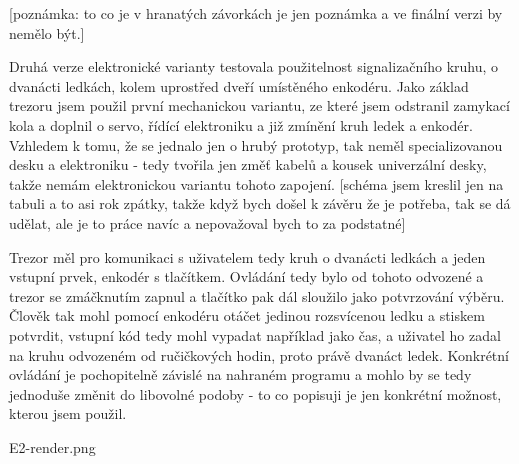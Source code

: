[poznámka: to co je v hranatých závorkách je jen poznámka a ve finální verzi by nemělo být.]

Druhá verze elektronické varianty testovala použitelnost signalizačního kruhu, o dvanácti ledkách, kolem uprostřed dveří
umístěného enkodéru. Jako základ trezoru jsem použil první mechanickou variantu, ze které jsem odstranil zamykací kola 
a doplnil o servo, řídící elektroniku a již zmínění kruh ledek a enkodér.
Vzhledem k tomu, že se jednalo jen o hrubý prototyp, tak neměl specializovanou desku a elektroniku - tedy tvořila jen změť kabelů 
a kousek univerzální desky, takže nemám elektronickou variantu tohoto zapojení. [schéma jsem kreslil jen na tabuli a to asi rok 
zpátky, takže když bych došel k závěru že je potřeba, tak se dá udělat, ale je to práce navíc a nepovažoval bych to za podstatné]

Trezor měl pro komunikaci s uživatelem tedy kruh o dvanácti ledkách a jeden vstupní prvek, enkodér s tlačítkem.
Ovládání tedy bylo od tohoto odvozené a trezor se zmáčknutím zapnul a tlačítko pak dál sloužilo jako potvrzování výběru.
Člověk tak mohl pomocí enkodéru otáčet jedinou rozsvícenou ledku a stiskem potvrdit, vstupní kód tedy mohl vypadat 
například jako čas, a uživatel ho zadal na kruhu odvozeném od ručičkových hodin, proto právě dvanáct ledek.
Konkrétní ovládání je pochopitelně závislé na nahraném programu a mohlo by se tedy jednoduše změnit do libovolné podoby -
to co popisuji je jen konkrétní možnost, kterou jsem použil.

E2-render.png